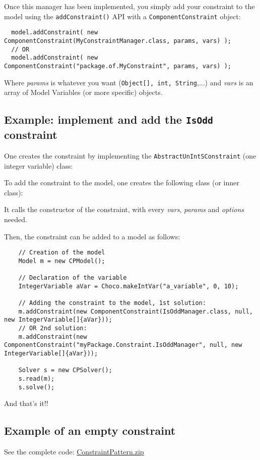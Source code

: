 Once this manager has been implemented, you simply add your constraint to the model using the \texttt{addConstraint()} API with a \texttt{ComponentConstraint} object:
\begin{lstlisting}
  model.addConstraint( new ComponentConstraint(MyConstraintManager.class, params, vars) );
  // OR
  model.addConstraint( new ComponentConstraint("package.of.MyConstraint", params, vars) );
\end{lstlisting}
Where \emph{params} is whatever you want (\texttt{Object[], int, String},...) and \emph{vars} is an array of Model Variables (or more specific) objects.

\subsection{Example: implement and add the \texttt{IsOdd} constraint}
One creates the constraint by implementing the \texttt{AbstractUnIntSConstraint} (one integer variable) class:


To add the constraint to the model, one creates the following class (or inner class):

It calls the constructor of the constraint, with every \emph{vars}, \emph{params} and \emph{options} needed.

Then, the constraint can be added to a model as follows:
\begin{lstlisting}
	// Creation of the model
	Model m = new CPModel();
	
	// Declaration of the variable
	IntegerVariable aVar = Choco.makeIntVar("a_variable", 0, 10);
	
	// Adding the constraint to the model, 1st solution:
	m.addConstraint(new ComponentConstraint(IsOddManager.class, null, new IntegerVariable[]{aVar}));
	// OR 2nd solution:
	m.addConstraint(new ComponentConstraint("myPackage.Constraint.IsOddManager", null, new IntegerVariable[]{aVar}));
	
	Solver s = new CPSolver();
	s.read(m);
	s.solve();
\end{lstlisting}
And that's it!!

\subsection{Example of an empty constraint}\label{advanced:anexempleofemptyconstraint}\hypertarget{advanced:anexempleofemptyconstraint}{}

See the complete code: \href{media/zip/constraintpattern.zip}{ConstraintPattern.zip}

